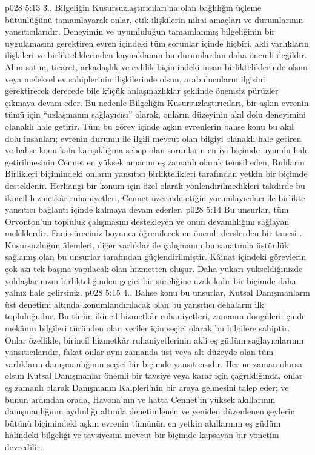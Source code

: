 \vs p028 5:13 3.\bibnobreakspace {}. Bilgeliğin Kusursuzlaştırıcıları’na olan bağlılığın üçleme bütünlüğünü tamamlayarak onlar, etik ilişkilerin nihai amaçları ve durumlarının yansıtıcılarıdır. Deneyimin ve uyumluluğun tamamlanmış bilgeliğinin bir uygulamasını gerektiren evren içindeki tüm sorunlar içinde hiçbiri, akli varlıkların ilişkileri ve birlikteliklerinden kaynaklanan bu durumlardan daha önemli değildir. Alım satım, ticaret, arkadaşlık ve evlilik biçimindeki insan birlikteliklerinde olsun veya meleksel ev sahiplerinin ilişkilerinde olsun, arabulucuların ilgisini gerektirecek derecede bile küçük anlaşmazlıklar şeklinde önemsiz pürüzler çıkmaya devam eder. Bu nedenle Bilgeliğin Kusursuzlaştırıcıları, bir aşkın evrenin tümü için “uzlaşmanın sağlayıcısı” olarak, onların düzeyinin akıl dolu deneyimini olanaklı hale getirir. Tüm bu görev içinde aşkın evrenlerin bahse konu bu akıl dolu insanları; evrenin durumu ile ilgili mevcut olan bilgiyi olanaklı hale getiren ve bahse konu kafa karışıklığına sebep olan sorunların en iyi biçimde uyumlu hale getirilmesinin Cennet en yüksek amacını eş zamanlı olarak temsil eden, Ruhların Birlikleri biçimindeki onların yansıtıcı birliktelikleri tarafından yetkin bir biçimde desteklenir. Herhangi bir konum için özel olarak yönlendirilmedikleri takdirde bu ikincil hizmetkâr ruhaniyetleri, Cennet üzerinde etiğin yorumlayıcıları ile birlikte yansıtıcı bağlantı içinde kalmaya devam ederler.
\vs p028 5:14 Bu unsurlar, tüm Orvonton’un topluluk çalışmasını destekleyen ve onun devamlılığını sağlayan meleklerdir. Fani süreciniz boyunca öğrenilecek en önemli derslerden bir tanesi . Kusursuzluğun âlemleri, diğer varlıklar ile çalışmanın bu sanatında üstünlük sağlamış olan bu unsurlar tarafından güçlendirilmiştir. Kâinat içindeki görevlerin çok azı tek başına yapılacak olan hizmetten oluşur. Daha yukarı yükseldiğinizde yoldaşlarınızın birlikteliğinden geçici bir süreliğine uzak kalır bir biçimde daha yalnız hale gelirsiniz.
\vs p028 5:15 4.\bibnobreakspace {}. Bahse konu bu unsurlar, Kutsal Danışmanların üst denetimi altında konumlandırılacak olan bu yansıtıcı dehaların ilk topluluğudur. Bu türün ikincil hizmetkâr ruhaniyetleri, zamanın döngüleri içinde mekânın bilgileri türünden olan veriler için seçici olarak bu bilgilere sahiptir. Onlar özellikle, birincil hizmetkâr ruhaniyetlerinin akli eş güdüm sağlayıcılarının yansıtıcılarıdır, fakat onlar aynı zamanda üst veya alt düzeyde olan tüm varlıkların danışmanlığının seçici bir biçimde yansıtıcısıdır. Her ne zaman olursa olsun Kutsal Danışmanlar önemli bir tavsiye veya karar için çağrıldığında, onlar eş zamanlı olarak Danışmanın Kalpleri’nin bir araya gelmesini talep eder; ve bunun ardından orada, Havona’nın ve hatta Cennet’in yüksek akıllarının danışmanlığının aydınlığı altında denetimlenen ve yeniden düzenlenen şeylerin bütünü biçimindeki aşkın evrenin tümünün en yetkin akıllarının eş güdüm halindeki bilgeliği ve tavsiyesini mevcut bir biçimde kapsayan bir yönetim devredilir.
